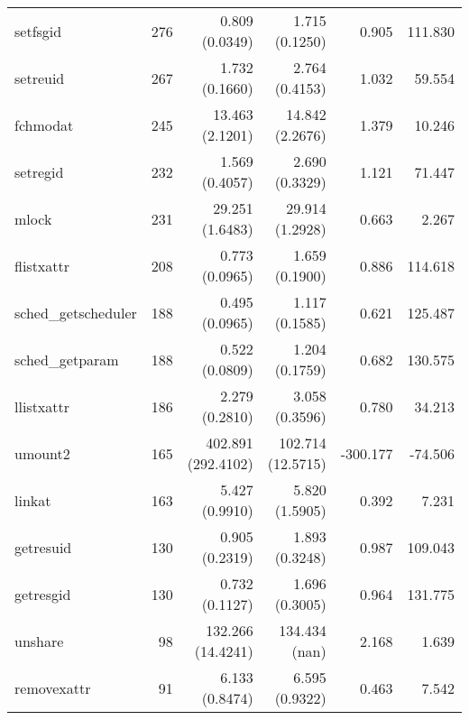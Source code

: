 \begin{longtable}{>{\ttfamily}lrrrrr}
                       setfsgid &        276 &              0.809 (0.0349) &            1.715 (0.1250) &           0.905 &      111.830 \\
                       setreuid &        267 &              1.732 (0.1660) &            2.764 (0.4153) &           1.032 &       59.554 \\
                       fchmodat &        245 &             13.463 (2.1201) &           14.842 (2.2676) &           1.379 &       10.246 \\
                       setregid &        232 &              1.569 (0.4057) &            2.690 (0.3329) &           1.121 &       71.447 \\
                          mlock &        231 &             29.251 (1.6483) &           29.914 (1.2928) &           0.663 &        2.267 \\
                     flistxattr &        208 &              0.773 (0.0965) &            1.659 (0.1900) &           0.886 &      114.618 \\
            sched\_getscheduler &        188 &              0.495 (0.0965) &            1.117 (0.1585) &           0.621 &      125.487 \\
                sched\_getparam &        188 &              0.522 (0.0809) &            1.204 (0.1759) &           0.682 &      130.575 \\
                     llistxattr &        186 &              2.279 (0.2810) &            3.058 (0.3596) &           0.780 &       34.213 \\
                        umount2 &        165 &          402.891 (292.4102) &         102.714 (12.5715) &        -300.177 &      -74.506 \\
                         linkat &        163 &              5.427 (0.9910) &            5.820 (1.5905) &           0.392 &        7.231 \\
                      getresuid &        130 &              0.905 (0.2319) &            1.893 (0.3248) &           0.987 &      109.043 \\
                      getresgid &        130 &              0.732 (0.1127) &            1.696 (0.3005) &           0.964 &      131.775 \\
                        unshare &         98 &           132.266 (14.4241) &             134.434 (nan) &           2.168 &        1.639 \\
                    removexattr &         91 &              6.133 (0.8474) &            6.595 (0.9322) &           0.463 &        7.542 \\

\end{longtable}
